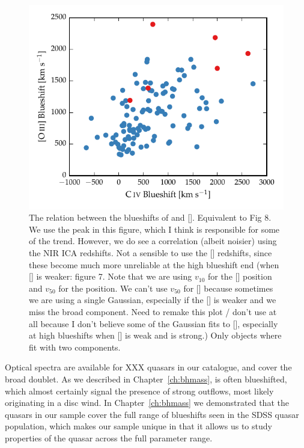 \begin{figure}
    \includegraphics[width=\columnwidth]{figures/chapter04/civ_blueshift_oiii_blueshift.pdf} 
    \caption{The relation between the blueshifts of  and []. Equivalent to Fig 8. We use the \hb peak in this figure, which I think is responsible for some of the trend. However, we do see a correlation (albeit noisier) using the NIR ICA redshifts. Not a sensible to use the [] redshifts, since these become much more unreliable at the high  blueshift end (when [] is weaker: figure 7. Note that we are using $v_{10}$ for the [] position and $v_{50}$ for the  position. We can't use $v_{50}$ for [] because sometimes we are using a single Gaussian, especially if the [] is weaker and we miss the broad component. Need to remake this plot / don't use at all because I don't believe some of the Gaussian fits to [], especially at high  blueshifts when [] is weak and  is strong.) Only objects where fit with two components.}     
    \label{fig:oiii_civ_blueshifts}
\end{figure}

Optical spectra are available for XXX quasars in our catalogue, and cover the broad  doublet. 
As we described in Chapter~\ref{ch:bhmass},  is often blueshifted, which almost certainly signal the presence of strong outflows, most likely originating in a disc wind.
In Chapter~\ref{ch:bhmass} we demonstrated that the quasars in our sample cover the full range of  blueshifts seen in the SDSS quasar population, which makes our sample unique in that it allows us to study properties of the quasar across the full parameter range. 

